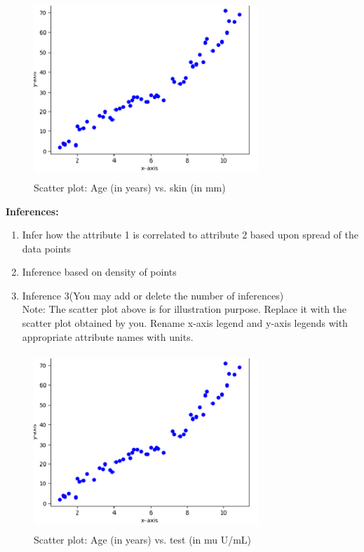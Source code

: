 \documentclass[12 pt, a4paper]{article}
\theoremstyle{definition}
\begin{document}
\begin{figure}[H]
	\centering
	\includegraphics[width=8.5cm,height=6.65cm]{Scatter Plot.png}
	\caption{Scatter plot: Age (in years) vs. skin (in mm)}
	\label{Blockdia}
\end{figure}

\textbf{\Large Inferences:}
\begin{enumerate}
   \item Infer how the attribute 1 is correlated to attribute 2 based upon spread of the data points
   \item Inference based on density of points
   \item Inference 3(You may add or delete the number of inferences)\\Note: The scatter plot above is for illustration purpose. Replace it with the scatter plot obtained by you. Rename x-axis legend and y-axis legends with appropriate attribute names with units.

\end{enumerate}

\begin{figure}[H]
	\centering
	\includegraphics[width=8.5cm,height=6.65cm]{Scatter Plot.png}
	\caption{Scatter plot: Age (in years) vs. test (in mu U/mL)}
	\label{Blockdia}
\end{figure}
\end{document}
